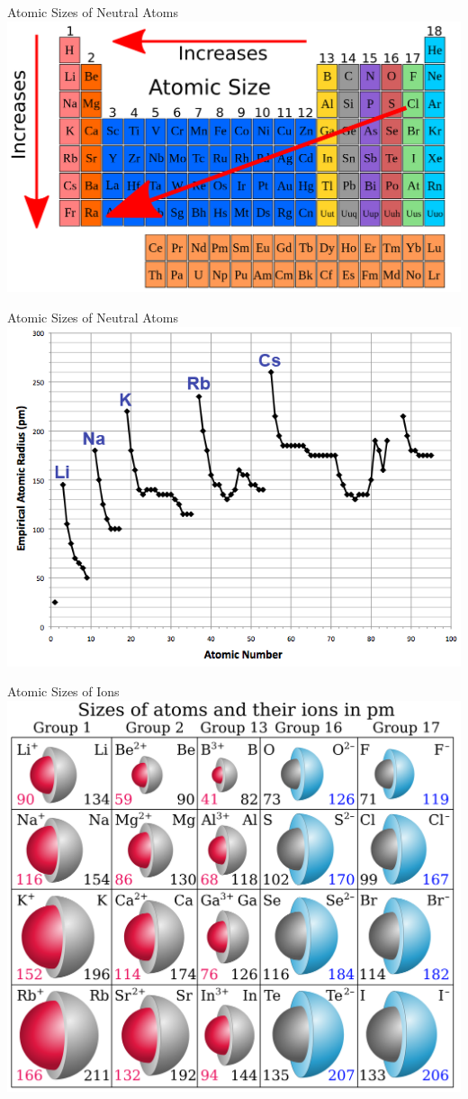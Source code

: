 \documentclass[11pt]{beamer}
\begin{document}
\begin{frame}{Atomic Sizes of Neutral Atoms}
  \centering
  \includegraphics[width=\linewidth]{atomic_trend}
\end{frame}

\begin{frame}{Atomic Sizes of Neutral Atoms}
  \centering
  \includegraphics[width=\linewidth]{graph_atomic_rad}
\end{frame}

\begin{frame}{Atomic Sizes of Ions}
  \centering
  \includegraphics[width=0.8\linewidth]{ion_radii}
\end{frame}
\end{document}
